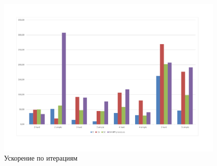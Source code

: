 \documentclass[runningheads]{llncs}
\begin{document}



\begin{figure} 
	\begin{center} 
		\begin{minipage}[h]{0.9\linewidth} 
			\includegraphics[width=1\linewidth]{figure/fig6.pdf} 
			\caption{Ускорение по итерациям} %
			\label{fig:fig4} 
		\end{minipage} 
	\end{center} 
\end{figure}	
\end{document}
